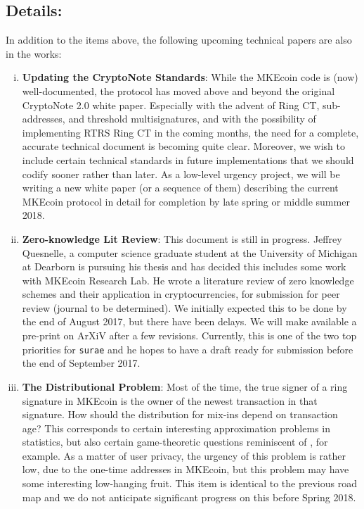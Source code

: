 \documentclass[12pt,english]{mrl}
\theoremstyle{definition}
\numberwithin{equation}{section}
\numberwithin{figure}{section}
\numberwithin{equation}{section}
\numberwithin{equation}{section}
\numberwithin{figure}{section}
\begin{document}
\subsection{Details:}
In addition to the items above, the following upcoming technical papers are also in the works:
\begin{enumerate}[(i)]
\item \textbf{Updating the CryptoNote Standards}: While the MKEcoin code is (now) well-documented, the protocol has moved above and beyond the original CryptoNote 2.0 white paper. Especially with the advent of Ring CT, sub-addresses, and threshold multisignatures, and with the possibility of implementing RTRS Ring CT in the coming months, the need for a complete, accurate technical document is becoming quite clear. Moreover, we wish to include certain technical standards in future implementations that we should codify sooner rather than later.  As a low-level urgency project, we will be writing a new white paper (or a sequence of them) describing the current MKEcoin protocol in detail for completion by late spring or middle summer 2018.

\item \textbf{Zero-knowledge Lit Review}: This document is still in progress.  Jeffrey Quesnelle, a computer science graduate student at the University of Michigan at Dearborn is pursuing his thesis and has decided this includes some work with MKEcoin Research Lab. He wrote a literature review of zero knowledge schemes and their application in cryptocurrencies, for submission for peer review (journal to be determined). We initially expected this to be done by the end of August 2017, but there have been delays. We will make available a pre-print on ArXiV after a few revisions. Currently, this is one of the two top priorities for \texttt{surae} and he hopes to have a draft ready for submission before the end of September 2017.

\item \textbf{The Distributional Problem}: Most of the time, the true signer of a ring signature in MKEcoin is the owner of the newest transaction in that signature. How should the distribution for mix-ins depend on transaction age? This corresponds to certain interesting approximation problems in statistics, but also certain game-theoretic questions reminiscent of \cite{T-1955}, for example. As a matter of user privacy, the urgency of this problem is rather low, due to the one-time addresses in MKEcoin, but this problem may have some interesting low-hanging fruit. This item is identical to the previous road map and we do not anticipate significant progress on this before Spring 2018.

\end{enumerate}
\end{document}
